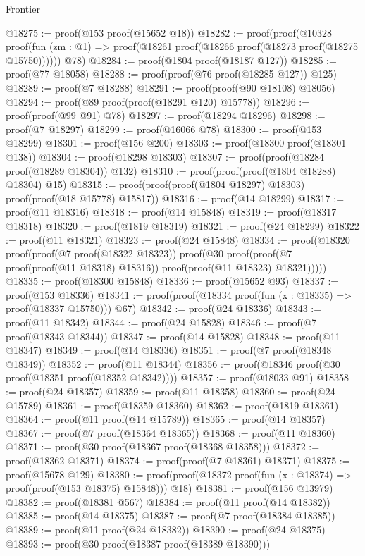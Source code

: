 \begin{lexlean}{Frontier}
\begin{coremodule}
@18275 := proof(@153 proof(@15652 @18))
@18282 := proof(proof(@10328
        proof(fun (zm : @1) => proof(@18261 proof(@18266 proof(@18273 proof(@18275 @15750))))))
      @78)
@18284 := proof(@1804 proof(@18187 @127))
@18285 := proof(@77 @18058)
@18288 := proof(proof(@76 proof(@18285 @127)) @125)
@18289 := proof(@7 @18288)
@18291 := proof(proof(@90 @18108) @18056)
@18294 := proof(@89 proof(proof(@18291 @120) @15778))
@18296 := proof(proof(@99 @91) @78)
@18297 := proof(@18294 @18296)
@18298 := proof(@7 @18297)
@18299 := proof(@16066 @78)
@18300 := proof(@153 @18299)
@18301 := proof(@156 @200)
@18303 := proof(@18300 proof(@18301 @138))
@18304 := proof(@18298 @18303)
@18307 := proof(proof(@18284 proof(@18289 @18304)) @132)
@18310 := proof(proof(proof(@1804 @18288) @18304) @15)
@18315 := proof(proof(proof(@1804 @18297) @18303) proof(proof(@18 @15778) @15817))
@18316 := proof(@14 @18299)
@18317 := proof(@11 @18316)
@18318 := proof(@14 @15848)
@18319 := proof(@18317 @18318)
@18320 := proof(@1819 @18319)
@18321 := proof(@24 @18299)
@18322 := proof(@11 @18321)
@18323 := proof(@24 @15848)
@18334 := proof(@18320
      proof(proof(@7 proof(@18322 @18323))
          proof(@30
              proof(proof(@7 proof(proof(@11 @18318) @18316)) proof(proof(@11 @18323) @18321)))))
@18335 := proof(@18300 @15848)
@18336 := proof(@15652 @93)
@18337 := proof(@153 @18336)
@18341 := proof(proof(@18334 proof(fun (x : @18335) => proof(@18337 @15750))) @67)
@18342 := proof(@24 @18336)
@18343 := proof(@11 @18342)
@18344 := proof(@24 @15828)
@18346 := proof(@7 proof(@18343 @18344))
@18347 := proof(@14 @15828)
@18348 := proof(@11 @18347)
@18349 := proof(@14 @18336)
@18351 := proof(@7 proof(@18348 @18349))
@18352 := proof(@11 @18344)
@18356 := proof(@18346 proof(@30 proof(@18351 proof(@18352 @18342))))
@18357 := proof(@18033 @91)
@18358 := proof(@24 @18357)
@18359 := proof(@11 @18358)
@18360 := proof(@24 @15789)
@18361 := proof(@18359 @18360)
@18362 := proof(@1819 @18361)
@18364 := proof(@11 proof(@14 @15789))
@18365 := proof(@14 @18357)
@18367 := proof(@7 proof(@18364 @18365))
@18368 := proof(@11 @18360)
@18371 := proof(@30 proof(@18367 proof(@18368 @18358)))
@18372 := proof(@18362 @18371)
@18374 := proof(proof(@7 @18361) @18371)
@18375 := proof(@15678 @129)
@18380 := proof(proof(@18372 proof(fun (x : @18374) => proof(proof(@153 @18375) @15848))) @18)
@18381 := proof(@156 @13979)
@18382 := proof(@18381 @567)
@18384 := proof(@11 proof(@14 @18382))
@18385 := proof(@14 @18375)
@18387 := proof(@7 proof(@18384 @18385))
@18389 := proof(@11 proof(@24 @18382))
@18390 := proof(@24 @18375)
@18393 := proof(@30 proof(@18387 proof(@18389 @18390)))

\end{coremodule}
\end{lexlean}
